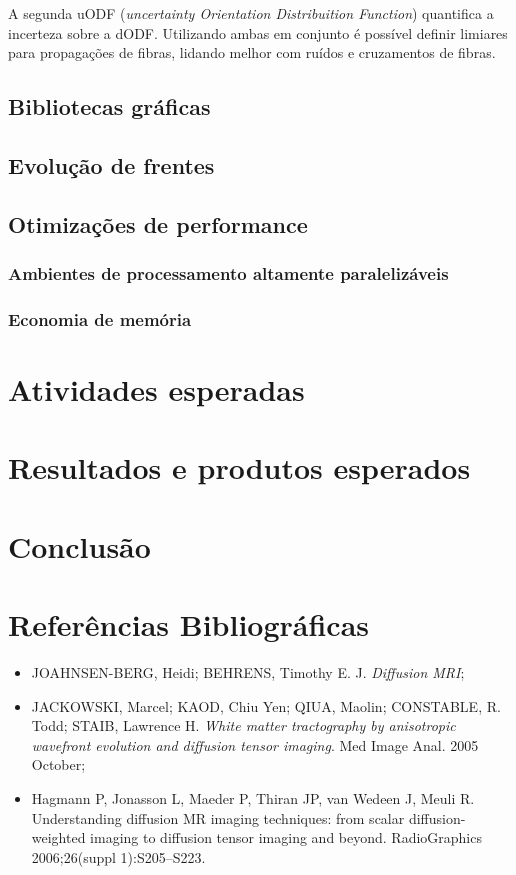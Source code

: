 \documentclass[a4paper,11pt]{report}
\begin{document}
  A segunda uODF (\textit{uncertainty Orientation Distribuition Function}) quantifica a incerteza sobre a dODF. Utilizando ambas em conjunto é possível definir limiares para propagações de fibras, lidando melhor com ruídos e cruzamentos de fibras.
  
  \section{Bibliotecas gráficas}
  
  \section{Evolução de frentes}
  
  
  \section{Otimizações de performance}
  
    \subsection{Ambientes de processamento altamente paralelizáveis}
    
    \subsection{Economia de memória}

\chapter{Atividades esperadas}

\chapter{Resultados e produtos esperados}

\chapter{Conclusão}

\chapter{Referências Bibliográficas}

\begin{itemize}
  \item JOAHNSEN-BERG, Heidi; BEHRENS, Timothy E. J. \textit{Diffusion MRI};
  \item JACKOWSKI, Marcel; KAOD, Chiu Yen; QIUA, Maolin; CONSTABLE, R. Todd; STAIB, Lawrence H. \textit{White matter tractography by anisotropic wavefront evolution and diffusion tensor imaging}. Med Image Anal. 2005 October;
  \item Hagmann P, Jonasson L, Maeder P, Thiran JP, van Wedeen J, Meuli R. Understanding diffusion MR imaging techniques: from scalar diffusion-weighted imaging to diffusion tensor imaging and beyond. RadioGraphics 2006;26(suppl 1):S205–S223.
\end{itemize}
\end{document}
